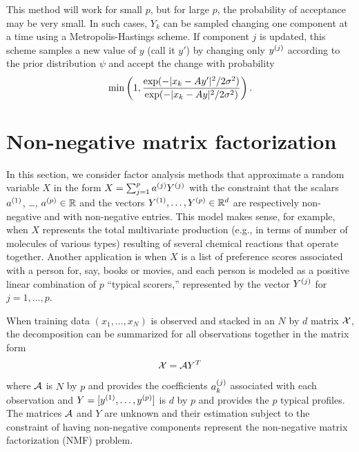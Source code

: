 This method will work for small $p$, but for large $p$, the probability of acceptance may be very small. In such cases, $Y_k$ can be sampled changing one component at a time using a Metropolis-Hastings scheme. If component $j$ is updated, this scheme  samples a new value of $y$ (call it $y'$) by changing only $y^{(j)}$ according to the prior distribution $\psi$ and accept the change with probability
\[
    \min\left(1, \frac{\exp(- |x_k - Ay'|^2/2\sigma^2)}{\exp(- |x_k - Ay|^2/2\sigma^2)}\right).
\]




\section{Non-negative matrix factorization}

In this section, we consider factor analysis methods  that approximate a random variable $X$ in the form $X = \sum_{j=1}^p a^{(j)} Y^{(j)}$ with the constraint that the scalars $a^{(1)}$, \ldots, $a^{(p)} \in {\mathbb{R}}$ and the vectors $Y^{(1)}, \ldots, Y^{(p)} \in {\mathbb{R}}^d$   are respectively non-negative and with non-negative entries. This model makes sense, for example, when $X$ represents the total multivariate production (e.g., in terms of number of molecules of various types) resulting of several chemical reactions that operate together. Another application is when $X$ is a list of preference scores associated with a person for, say, books or movies, and  each person is modeled as a positive linear combination of $p$ ``typical scorers,'' represented by the vector $Y^{(j)}$ for $j=1, \ldots, p$. 

When training data $(x_1, \ldots, x_N)$ is observed and stacked in an $N$ by $d$ matrix ${\mathcal X}$,  the decomposition can be summarized for all observations together in the matrix form
\[
{\mathcal X} = {\mathcal A} Y^T
\]
where ${\mathcal A}$ is $N$ by $p$ and provides the coefficients $a_k^{(j)}$ associated with each observation and  $Y = [y^{(1)}, \ldots, y^{(p)}]$ is $d$ by $p$ and provides the $p$ typical profiles. 
The matrices ${\mathcal A}$ and $Y$ are unknown and their estimation subject to the constraint of having non-negative components represent the non-negative matrix factorization (NMF) problem. 

